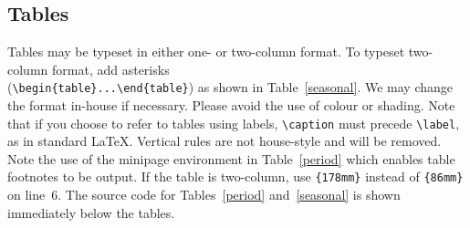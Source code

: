 \documentclass[review,aog]{igs}
\begin{document}
\subsection{Tables}

Tables may be typeset in either one- or two-column format. To typeset two-column format, add asterisks\\
(\verb"\begin{table}...\end{table}") as shown in Table~\ref{seasonal}. We may change the format in-house if necessary. Please avoid the use of colour or shading. Note that if you choose to refer to tables using labels, \verb"\caption" must precede \verb"\label", as in standard \LaTeX. Vertical rules are not house-style and will be removed. Note the use of the minipage environment in Table~\ref{period} which enables table footnotes to be output. If the table is two-column, use \texttt{\{178mm\}} instead of \texttt{\{86mm\}} on line~6. The source code for Tables~\ref{period} and~\ref{seasonal} is shown immediately below the tables.
\end{document}
